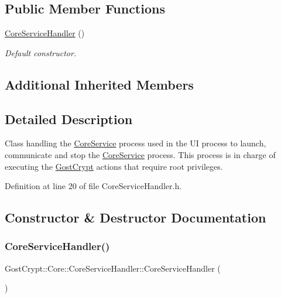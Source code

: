 \subsection*{Public Member Functions}
\begin{DoxyCompactItemize}
\item 
\hyperlink{class_gost_crypt_1_1_core_1_1_core_service_handler_a698d74f57a84e6592905055f5b8757a5}{Core\+Service\+Handler} ()
\begin{DoxyCompactList}\small\item\em Default constructor. \end{DoxyCompactList}\end{DoxyCompactItemize}
\subsection*{Additional Inherited Members}


\subsection{Detailed Description}
Class handling the \hyperlink{class_gost_crypt_1_1_core_1_1_core_service}{Core\+Service} process used in the UI process to launch, communicate and stop the \hyperlink{class_gost_crypt_1_1_core_1_1_core_service}{Core\+Service} process. This process is in charge of executing the \hyperlink{namespace_gost_crypt}{Gost\+Crypt} actions that require root privileges. 

Definition at line 20 of file Core\+Service\+Handler.\+h.



\subsection{Constructor \& Destructor Documentation}
\mbox{\label{class_gost_crypt_1_1_core_1_1_core_service_handler_a698d74f57a84e6592905055f5b8757a5}} 
\subsubsection{\texorpdfstring{Core\+Service\+Handler()}{CoreServiceHandler()}}
{\footnotesize\ttfamily Gost\+Crypt\+::\+Core\+::\+Core\+Service\+Handler\+::\+Core\+Service\+Handler (\begin{DoxyParamCaption}{ }\end{DoxyParamCaption})}



